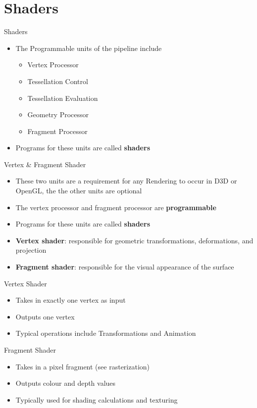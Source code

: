 \part{Shaders}
\frame{\partpage}

\begin{frame}{Shaders}
\begin{itemize}
	\item The Programmable units of the pipeline include
	\begin{itemize}
		\pause \item Vertex Processor
		\pause \item Tessellation Control
		\pause \item Tessellation Evaluation
		\pause \item Geometry Processor
		\pause \item Fragment Processor 
	\end{itemize}
	\pause\item Programs for these units are called \textbf{shaders}
\end{itemize}
\end{frame}

\begin{frame}{Vertex \& Fragment Shader}
\begin{itemize}
	\item These two units are a requirement for any Rendering to occur in D3D or OpenGL, the the other units are optional
	\pause\item The vertex processor and fragment processor are \textbf{programmable}
	\pause\item Programs for these units are called \textbf{shaders}
	\pause\item \textbf{Vertex shader}: responsible for geometric transformations, deformations, and projection
	\pause\item \textbf{Fragment shader}: responsible for the visual appearance of the surface
\end{itemize}
\end{frame}

\begin{frame}{Vertex Shader}
\begin{itemize}
	\item Takes in exactly one vertex as input
	\pause \item Outputs one vertex
	\pause \item Typical operations include Transformations and Animation
\end{itemize}
\end{frame}

\begin{frame}{Fragment Shader}
\begin{itemize}
	\item Takes in a pixel fragment (see rasterization)
	\pause \item Outputs colour and depth values
	\pause \item Typically used for shading calculations and texturing
\end{itemize}
\end{frame}
	
